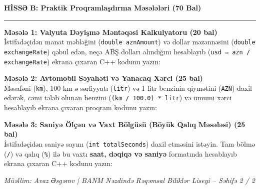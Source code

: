\documentclass[10.5pt,a4paper]{article}
\begin{document}
\newpage

{\large \textbf{HİSSƏ B: Praktik Proqramlaşdırma Məsələləri (70 Bal)}}
\vspace{0.05cm}
\hrule
\vspace{0.15cm}

\textbf{Məsələ 1: Valyuta Dəyişmə Məntəqəsi Kalkulyatoru (20 bal)}\\
İstifadəçidən manat məbləğini (\texttt{double aznAmount}) və dollar məzənnəsini (\texttt{double exchangeRate}) qəbul edən, neçə ABŞ dolları alındığını hesablayıb (\texttt{usd = azn / exchangeRate}) ekrana çıxaran C++ kodunu yazın:

\noindent{}

\vspace{0.25cm}
\textbf{Məsələ 2: Avtomobil Səyahəti və Yanacaq Xərci (25 bal)}\\
Məsafəni (\texttt{km}), 100 km-ə sərfiyyatı (\texttt{litr}) və 1 litr benzinin qiymətini (\texttt{AZN}) daxil edərək, cəmi tələb olunan benzini (\texttt{(km / 100.0) * litr}) və ümumi xərci hesablayıb ekrana çıxaran proqram kodunu yazın:

\noindent{}

\vspace{0.25cm}
\textbf{Məsələ 3: Saniyə Ölçən və Vaxt Bölgüsü (Böyük Qalıq Məsələsi) (25 bal)}\\
İstifadəçidən saniyə sayını (\texttt{int totalSeconds}) daxil etməsini istəyin. Tam bölmə (\texttt{/}) və qalıq (\texttt{\%}) ilə bu vaxtı \textbf{saat, dəqiqə və saniyə} formatında hesablayıb ekrana çıxaran C++ kodunu yazın:

\noindent{}

\vfill
\begin{center}
\footnotesize \textit{Müəllim: Avaz Əsgərov | BANM Nəzdində Rəqəmsal Biliklər Liseyi -- Səhifə 2 / 2}
\end{center}
\end{document}
